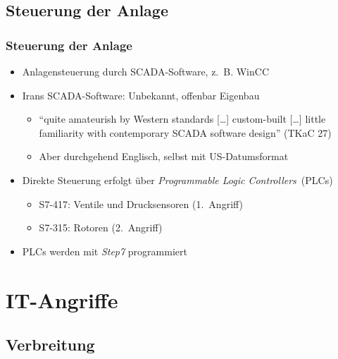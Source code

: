 \documentclass{beamer}
\begin{document}
\subsection{Steuerung der Anlage}

\begin{frame}
  \frametitle{Steuerung der Anlage}
  \begin{itemize}
    \item Anlagensteuerung durch SCADA-Software, z.~B. WinCC
    \item Irans SCADA-Software: Unbekannt, offenbar Eigenbau
      \begin{itemize}
        \item ``quite amateurish by Western standards […] custom-built […] little familiarity with contemporary SCADA software design'' (TKaC 27)
        \item Aber durchgehend Englisch, selbst mit US-Datumsformat
      \end{itemize}
    \item Direkte Steuerung erfolgt über \emph{Programmable Logic Controllers}~(PLCs)
      \begin{itemize}
        \item S7-417: Ventile und Drucksensoren (1.~Angriff)
        \item S7-315: Rotoren (2.~Angriff)
      \end{itemize}
    \item PLCs werden mit \emph{Step7} programmiert
  \end{itemize}
\end{frame}

\section{IT-Angriffe}

\subsection{Verbreitung}
\end{document}
